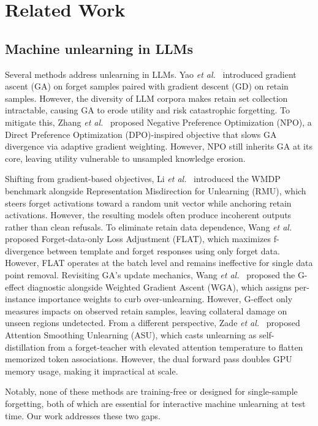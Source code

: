 \section{Related Work}
\label{sec:related}
\subsection{Machine unlearning in LLMs}
Several methods address unlearning in LLMs. Yao \textit{et al.}~\cite{yao2024large} introduced gradient ascent (GA) on forget samples paired with gradient descent (GD) on retain samples. However, the diversity of LLM corpora makes retain set collection intractable, causing GA to erode utility and risk catastrophic forgetting. To mitigate this, Zhang \textit{et al.}~\cite{zhang2024negative} proposed Negative Preference Optimization (NPO), a Direct Preference Optimization (DPO)-inspired objective that slows GA divergence via adaptive gradient weighting. However, NPO still inherits GA at its core, leaving utility vulnerable to unsampled knowledge erosion. 

Shifting from gradient-based objectives, Li \textit{et al.}~\cite{li2024wmdp} introduced the WMDP benchmark alongside Representation Misdirection for Unlearning (RMU), which steers forget activations toward a random unit vector while anchoring retain activations. However, the resulting models often produce incoherent outputs rather than clean refusals. To eliminate retain data dependence, Wang \textit{et al.}~\cite{wang2024llm} proposed Forget-data-only Loss Adjustment (FLAT), which maximizes f-divergence between template and forget responses using only forget data. However, FLAT operates at the batch level and remains ineffective for single data point removal. Revisiting GA’s update mechanics, Wang \textit{et al.}~\cite{wang2025rethinking} proposed the G-effect diagnostic alongside Weighted Gradient Ascent (WGA), which assigns per-instance importance weights to curb over-unlearning. However, G-effect only measures impacts on observed retain samples, leaving collateral damage on unseen regions undetected. From a different perspective, Zade \textit{et al.}~\cite{zade2026attention} proposed Attention Smoothing Unlearning (ASU), which casts unlearning as self-distillation from a forget-teacher with elevated attention temperature to flatten memorized token associations. However, the dual forward pass doubles GPU memory usage, making it impractical at scale. 

Notably, none of these methods are training-free or designed for single-sample forgetting, both of which are essential for interactive machine unlearning at test time. Our work addresses these two gaps.

